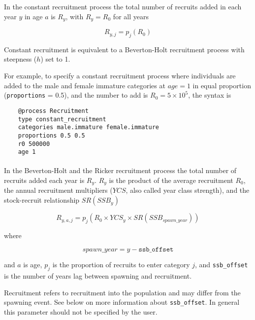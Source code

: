 In the constant recruitment process the total number of recruits added in each year $y$ in age $a$ is $R_y$, with $R_y = R_0$ for all years

\begin{equation}
  R_{y,j} = p_j(R_0)
\end{equation}

Constant recruitment is equivalent to a Beverton-Holt recruitment process with steepness ($h$) set to 1.

For example, to specify a constant recruitment process where individuals are added to the male and female immature categories at $age=1$ in equal proportion (\texttt{proportions} = 0.5), and the number to add is $R_0=5 \times 10^5$, the syntax is

{\small{\begin{verbatim}
	@process Recruitment
	type constant_recruitment
	categories male.immature female.immature
	proportions 0.5 0.5
	r0 500000
	age 1
\end{verbatim}}}

\paragraph{}\label{sec:Process-RecruitmentBevertonHolt}\label{sec:Process-RecruitmentRicker}

In the Beverton-Holt and the Ricker recruitment process the total number of recruits added each year is $R_y$. $R_y$ is the product of the average recruitment $R_0$, the annual recruitment multipliers ($YCS$, also called year class strength), and the stock-recruit relationship $SR(SSB_y)$

\begin{equation}\label{eq:BH}
  R_{y,a,j} = p_j(R_0 \times YCS_{y} \times SR(SSB_{spawn\_year}))
\end{equation}

where

\begin{equation}\label{eq:year_class}
spawn\_year = y - \texttt{ssb\_offset}
\end{equation}

and $a$ is age, $p_j$ is the proportion of recruits to enter category $j$, and \texttt{ssb\_offset} is the number of years lag between spawning and recruitment.

Recruitment refers to recruitment into the population and may differ from the spawning event. See below on more information about \texttt{ssb\_offset}. In general this parameter should not be specified by the user.

